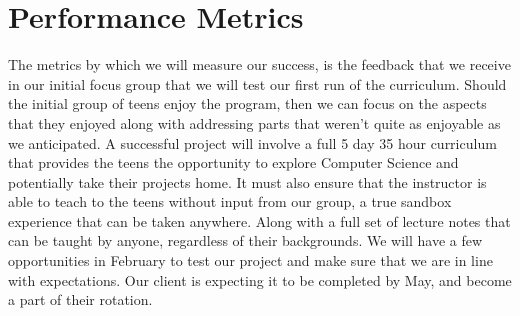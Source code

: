 \documentclass[10pt,a4paper,onecolumn,draftclsnofoot]{IEEEtran}
\begin{document}
\section*{Performance Metrics}
The metrics by which we will measure our success, is the feedback that we receive in our initial focus group that we will test our first run of the curriculum. Should the initial group of teens enjoy the program, then we can focus on the aspects that they enjoyed along with addressing parts that weren't quite as enjoyable as we anticipated. A successful project will involve a full 5 day 35 hour curriculum that provides the teens the opportunity to explore Computer Science and potentially take their projects home. It must also ensure that the instructor is able to teach to the teens without input from our group, a true sandbox experience that can be taken anywhere. Along with a full set of lecture notes that can be taught by anyone, regardless of their backgrounds. We will have a few opportunities in February to test our project and make sure that we are in line with expectations. Our client is expecting it to be completed by May, and become a part of their rotation. 
\end{document}
